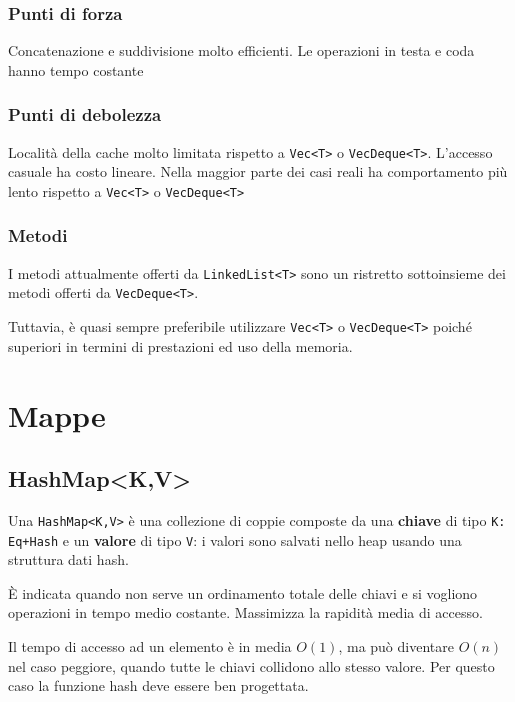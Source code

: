 \subsubsection{Punti di forza}

Concatenazione e suddivisione molto efficienti. Le operazioni in testa e coda
hanno tempo costante


\subsubsection{Punti di debolezza}

Località della cache molto limitata rispetto a \verb|Vec<T>| o
\verb|VecDeque<T>|. L'accesso casuale ha costo lineare. Nella maggior parte dei
casi reali ha comportamento più lento rispetto a \verb|Vec<T>| o
\verb|VecDeque<T>|



\subsubsection{Metodi}

I metodi attualmente offerti da \texttt{LinkedList<T>} sono un ristretto
sottoinsieme dei metodi offerti da \texttt{VecDeque<T>}.

Tuttavia, è quasi sempre preferibile utilizzare \texttt{Vec<T>}  o \texttt{VecDeque<T>}
poiché superiori in termini di prestazioni ed uso della memoria.

\section{Mappe}

\subsection{HashMap<K,V>}

Una \texttt{HashMap<K,V>} è una collezione di coppie composte da una
\textbf{chiave} di tipo \texttt{K: Eq+Hash} e un \textbf{valore} di tipo
\texttt{V}: i valori sono salvati nello heap usando una struttura dati hash.

È indicata quando non serve un ordinamento totale delle chiavi e si vogliono
operazioni in tempo medio costante. Massimizza la rapidità media di accesso.


Il tempo di accesso ad un elemento è in media $O(1)$, ma può diventare $O(n)$
nel caso peggiore, quando tutte le chiavi collidono allo stesso valore.
Per questo caso la funzione hash deve essere ben progettata.


